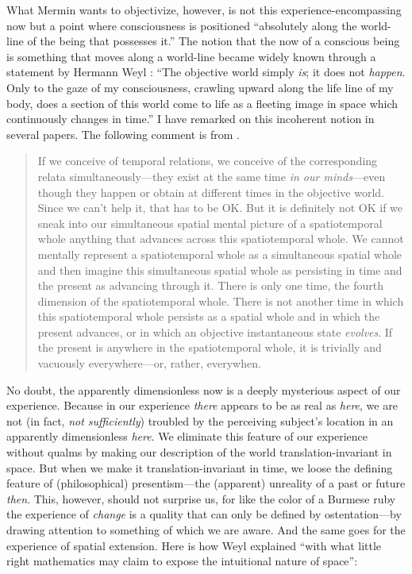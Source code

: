 \documentclass[12pt]{article}
\newcommand{\bq}{\begin{quote}}
\newcommand{\eq}{\end{quote}}
\begin{document}
What Mermin \cite{Mermin_Nature} wants to objectivize, however, is not this experience-encompassing now but a point where consciousness is positioned ``absolutely along the world-line of the being that possesses it.'' The notion that the now of a conscious being is something that moves along a world-line became widely known through a statement by Hermann Weyl \cite{Weyl1949}: ``The objective world simply \emph{is}; it does not \emph{happen}. Only to the gaze of my consciousness, crawling upward along the life line of my body, does a section of this world come to life as a fleeting image in space which continuously changes in time.'' I have remarked on this incoherent notion in several papers. The following comment is from \cite{18errors}.
\bq
If we conceive of temporal relations, we conceive of the corresponding relata simultaneously---they exist at the same time \emph{in our minds}---even though they happen or obtain at different times in the objective world. Since we can't help it, that has to be OK. But it is definitely not OK if we sneak into our simultaneous spatial mental picture of a spatiotemporal whole anything that advances across this spatiotemporal whole. We cannot mentally represent a spatiotemporal whole as a simultaneous spatial whole and then imagine this simultaneous spatial whole as persisting in time and the present as advancing through it. There is only one time, the fourth dimension of the spatiotemporal whole. There is not another time in which this spatiotemporal whole persists as a spatial whole and in which the present advances, or in which an objective instantaneous state \emph{evolves}. If the present is anywhere in the spatiotemporal whole, it is trivially and vacuously everywhere---or, rather, everywhen.
\eq
No doubt, the apparently dimensionless {now} is a deeply mysterious aspect of our experience. Because in our experience \emph{there} appears to be as real as \emph{here}, we are not (in fact, \emph{not sufficiently}) troubled by the perceiving subject's location in an apparently dimensionless \emph{here}. We eliminate this feature of our experience without qualms by making our description of the world translation-invariant in space. But when we make it translation-invariant in time, we loose the defining feature of (philosophical) presentism---the (apparent) unreality of a past or future \emph{then}. This, however, should not surprise us, for like the color of a Burmese ruby the experience of \emph{change} is a quality that can only be defined by {ostentation}---by drawing attention to something of which we are aware. And the same goes for the experience of spatial extension. Here is how Weyl \cite{Weyl1922} explained ``with what little right mathematics may claim to expose the intuitional nature of space'':
\end{document}
